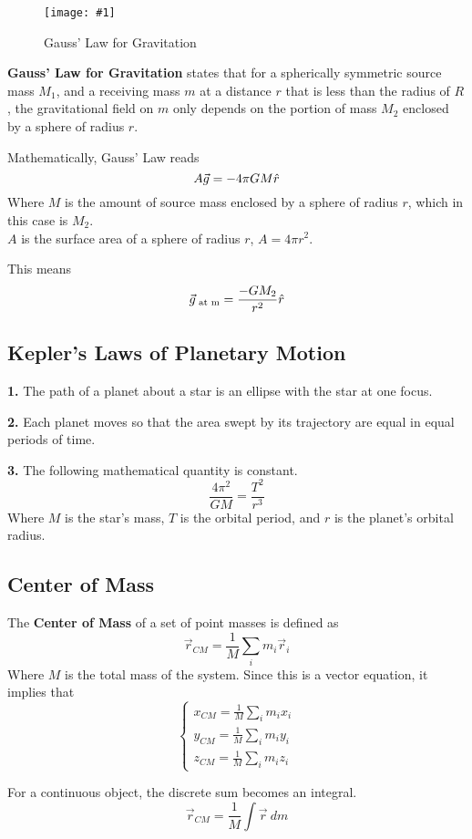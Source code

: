 \documentclass[11pt]{article}
\newcommand{\fig}[4]{
    \begin{figure}[H]
        \centering
        \texttt{[image: \#1]}
        \caption{#2}
        \label{exp4fit}
    \end{figure}
}
\theoremstyle{gangnamstyle}{\newtheorem{definition}{Definition}[]}
\theoremstyle{gangnamstyle}{\newtheorem{example}{Example}[]}
\theoremstyle{gangnamstyle}{\newtheorem{problem}{Problem}[]}
\begin{document}
\fig{figs/0716/gauss.jpeg}{Gauss' Law for Gravitation}{0.1}{0}

\textbf{Gauss' Law for Gravitation} states that for a spherically symmetric source mass $M_1$, and a receiving mass $m$ at a distance $r$ that is less than the radius of $R$, the gravitational field on $m$ only depends on the portion of mass $M_2$ enclosed by a sphere of radius $r$. 

Mathematically, Gauss' Law reads
\[ A \Vec{g} = -4\pi GM \Hat{r} \]
Where $M$ is the amount of source mass enclosed by a sphere of radius $r$, which in this case is $M_2$. \\
$A$ is the surface area of a sphere of radius $r$, $A = 4\pi r^2$. 

This means
\[ \Vec{g}_{\text{ at m}} = \frac{-GM_2}{r^2}\Hat{r} \]

\subsection{Kepler's Laws of Planetary Motion}

\textbf{1.} The path of a planet about a star is an ellipse with the star at one focus. 

\textbf{2.} Each planet moves so that the area swept by its trajectory are equal in equal periods of time. 

\textbf{3.} The following mathematical quantity is constant.  
\[ \frac{4\pi^2}{GM} = \frac{T^2}{r^3} \]
Where $M$ is the star's mass, $T$ is the orbital period, and $r$ is the planet's orbital radius. 

\pagebreak

\subsection{Center of Mass}

The \textbf{Center of Mass} of a set of point masses is defined as
\[ \Vec{r}_{CM} = \frac{1}{M} \sum_i m_i\Vec{r}_i \]
Where $M$ is the total mass of the system. Since this is a vector equation, it implies that 
\[ \begin{cases}
x_{CM} = \frac{1}{M} \sum_i m_ix_i \\
y_{CM} = \frac{1}{M} \sum_i m_iy_i \\
z_{CM} = \frac{1}{M} \sum_i m_iz_i
\end{cases} \]

For a continuous object, the discrete sum becomes an integral. 
\[ \Vec{r}_{CM} = \frac{1}{M} \int \Vec{r} \ dm \]
\end{document}
